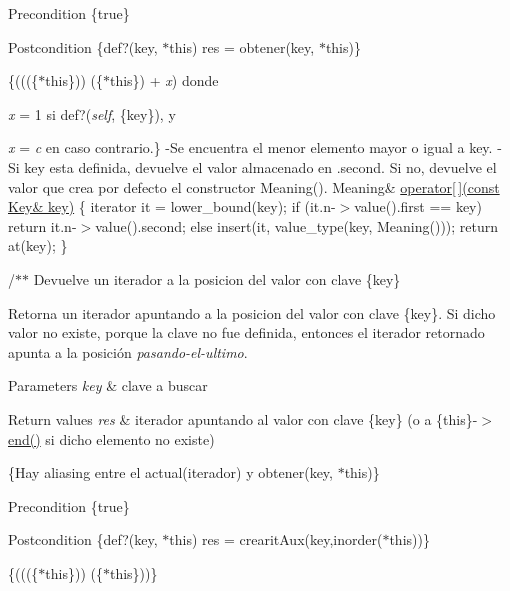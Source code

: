 \begin{DoxyPrecond}{\-Precondition}
\{true\} 
\end{DoxyPrecond}
\begin{DoxyPostcond}{\-Postcondition}
\{def?(key, $\ast$this)  res = obtener(key, $\ast$this)\}
\end{DoxyPostcond}
\{(((\{$\ast$this\}))  (\{$\ast$this\}) + {\itshape x\/}) donde
\begin{DoxyItemize}
\item {\itshape x\/} = 1 si def?({\itshape self\/}, \{key\}), y
\item {\itshape x\/} = {\itshape c\/} en caso contrario.\} -\/\-Se encuentra el menor elemento mayor o igual a key. -\/\-Si key esta definida, devuelve el valor almacenado en .second. \-Si no, devuelve el valor que crea por defecto el constructor \-Meaning(). \-Meaning\& \hyperlink{classaed2_1_1map_a96f23896164ab47bee48c26b803f9801}{operator\mbox{[}$\,$\mbox{]}(const Key\& key)} \{ iterator it = lower\-\_\-bound(key); if (it.\-n-\/$>$value().first == key) return it.\-n-\/$>$value().second; else insert(it, value\-\_\-type(key, \-Meaning())); return at(key); \}
\end{DoxyItemize}

/$\ast$$\ast$ \-Devuelve un iterador a la posicion del valor con clave \{key\}

\-Retorna un iterador apuntando a la posicion del valor con clave \{key\}. \-Si dicho valor no existe, porque la clave no fue definida, entonces el iterador retornado apunta a la posición {\itshape pasando-\/el-\/ultimo\/}.


\begin{DoxyParams}{\-Parameters}
{\em key} & clave a buscar \\
\hline
\end{DoxyParams}

\begin{DoxyRetVals}{\-Return values}
{\em res} & iterador apuntando al valor con clave \{key\} (o a \{this\}-\/$>$\hyperlink{classaed2_1_1map_a76023e6a56cb625513e1b5ea028bf983}{end()} si dicho elemento no existe)\\
\hline
\end{DoxyRetVals}
\{\-Hay aliasing entre el actual(iterador) y obtener(key, $\ast$this)\}

\begin{DoxyPrecond}{\-Precondition}
\{true\} 
\end{DoxyPrecond}
\begin{DoxyPostcond}{\-Postcondition}
\{def?(key, $\ast$this)  res = crearit\-Aux(key,inorder($\ast$this))\}
\end{DoxyPostcond}
\{(((\{$\ast$this\}))  (\{$\ast$this\}))\}

